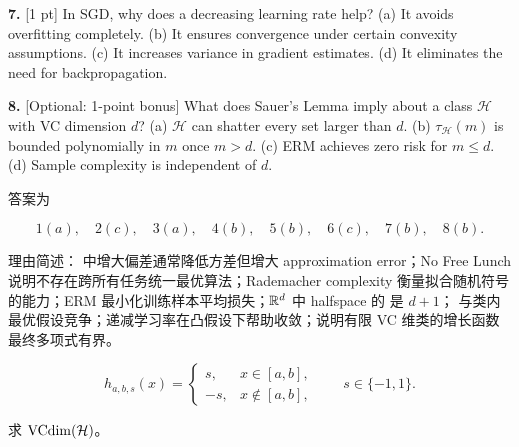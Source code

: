 \begin{examproblem}[A1-A8：选择题]
{\textbf{7.} [1 pt] In SGD, why does a decreasing learning rate help? (a) It avoids overfitting completely. (b) It ensures convergence under certain convexity assumptions. (c) It increases variance in gradient estimates. (d) It eliminates the need for backpropagation.

\textbf{8.} [Optional: 1-point bonus] What does Sauer's Lemma imply about a class \(\mathcal H\) with VC dimension \(d\)? (a) \(\mathcal H\) can shatter every set larger than \(d\). (b) \(\tau_{\mathcal H}(m)\) is bounded polynomially in \(m\) once \(m>d\). (c) ERM achieves zero risk for \(m\le d\). (d) Sample complexity is independent of \(d\).}
\end{examproblem}

\solution
答案为

\[
  1(a),\quad
  2(c),\quad
  3(a),\quad
  4(b),\quad
  5(b),\quad
  6(c),\quad
  7(b),\quad
  8(b).
\]

理由简述： 中增大偏差通常降低方差但增大 approximation error；No Free Lunch 说明不存在跨所有任务统一最优算法；Rademacher complexity 衡量拟合随机符号的能力；ERM 最小化训练样本平均损失；\(\mathbb{R}^d\) 中 halfspace 的 是 \(d+1\)； 与类内最优假设竞争；递减学习率在凸假设下帮助收敛；说明有限 VC 维类的增长函数最终多项式有界。

\begin{examproblem}

\[
  h_{a,b,s}(x)=
  \begin{cases}
  s, & x\in [a,b],\\
  -s, & x\notin [a,b],
  \end{cases}
  \qquad s\in\{-1,1\}.
\]

求 \(\operatorname{VCdim}(\mathcal{H})\)。
\end{examproblem}

